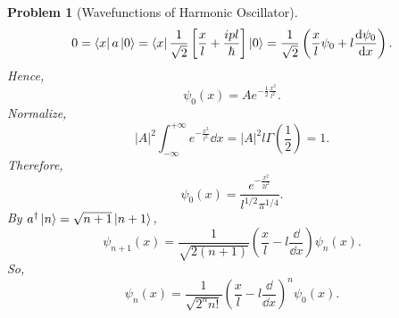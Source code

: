 \documentclass{article}
\theoremstyle{1}
\newtheorem{problem}{Problem}
\begin{document}
\begin{problem}[Wavefunctions of Harmonic Oscillator]
    \begin{equation}
        0=\bra{x}a\ket{0}=\bra{x}\frac{1}{\sqrt{2}}\left[\frac{x}{l}+\frac{ipl}{\hbar}\right]\ket{0}=\frac{1}{\sqrt{2}}\left(\frac{x}{l}\psi_0+l\frac{\dd{\psi_0}}{\dd{x}}\right).
    \end{equation}
    Hence, 
    \begin{equation}
        \psi_0(x)=Ae^{-\frac{1}{2}\frac{x^2}{l^2}}.
    \end{equation}
    Normalize,
    \begin{equation}
        \left|A\right|^2\int_{-\infty}^{+\infty}e^{-\frac{x^2}{l^2}}\dd{x}=\left|A\right|^2l \Gamma \left(\frac{1}{2}\right)=1.
    \end{equation}
    Therefore,
    \begin{equation}
        \boxed{\psi_0(x)=\frac{e^{-\frac{x^2}{2l^2}}}{l^{1/2}\pi^{1/4}}.}
    \end{equation}
    By $a^\dagger\ket{n}=\sqrt{n+1}\ket{n+1}$,
    \begin{equation}
        \psi_{n+1}(x)=\frac{1}{\sqrt{2(n+1)}}\left(\frac{x}{l}-l\frac{\dd}{\dd{x}}\right)\psi_n(x).
    \end{equation}
    So, 
    \begin{equation}
        \boxed{\psi_n(x)=\frac{1}{\sqrt{2^nn!}}\left(\frac{x}{l}-l\frac{\dd}{\dd{x}}\right)^n\psi_0(x).}
    \end{equation}
\end{problem}
\end{document}

